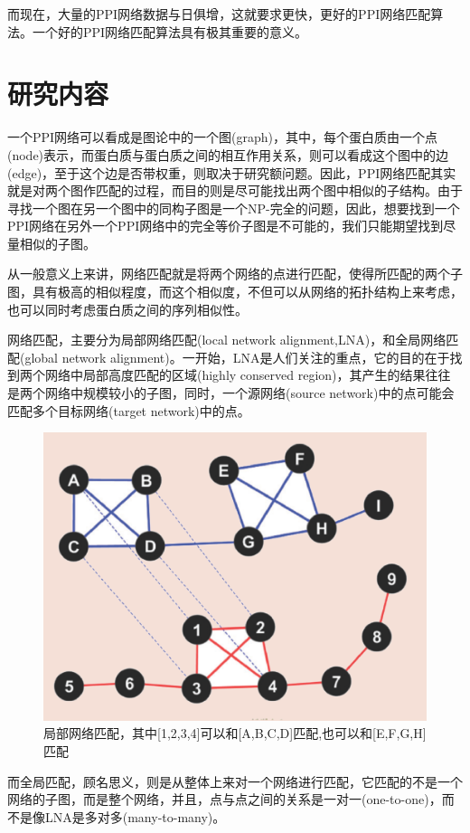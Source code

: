 而现在，大量的PPI网络数据与日俱增\cite{breitkreutz2008biogrid,hulovatyy2014revealing}，这就要求更快，更好的PPI网络匹配算法。一个好的PPI网络匹配算法具有极其重要的意义。

\section{研究内容}
一个PPI网络可以看成是图论中的一个图(graph)，其中，每个蛋白质由一个点(node)表示，而蛋白质与蛋白质之间的相互作用关系，则可以看成这个图中的边(edge)，至于这个边是否带权重，则取决于研究额问题。因此，PPI网络匹配其实就是对两个图作匹配的过程，而目的则是尽可能找出两个图中相似的子结构。由于寻找一个图在另一个图中的同构子图是一个NP-完全的问题\cite{cook1971complexity}，因此，想要找到一个PPI网络在另外一个PPI网络中的完全等价子图是不可能的，我们只能期望找到尽量相似的子图。

从一般意义上来讲，网络匹配就是将两个网络的点进行匹配，使得所匹配的两个子图，具有极高的相似程度，而这个相似度，不但可以从网络的拓扑结构上来考虑，也可以同时考虑蛋白质之间的序列相似性。

网络匹配，主要分为局部网络匹配(local network alignment,LNA)，和全局网络匹配(global network alignment)。一开始，LNA是人们关注的重点，它的目的在于找到两个网络中局部高度匹配的区域(highly conserved region)，其产生的结果往往是两个网络中规模较小的子图，同时，一个源网络(source network)中的点可能会匹配多个目标网络(target network)中的点。

\begin{figure}[htbp]
\centering
\includegraphics[height=0.25\textheight]{pic/lna.png}
\captionsetup{margin=50pt}
\caption{局部网络匹配，其中[1,2,3,4]可以和[A,B,C,D]匹配,也可以和[E,F,G,H]匹配 \cite{atias2012comparative} \label{fig:lna}}
\end{figure}
而全局匹配，顾名思义，则是从整体上来对一个网络进行匹配，它匹配的不是一个网络的子图，而是整个网络，并且，点与点之间的关系是一对一(one-to-one)，而不是像LNA是多对多(many-to-many)。

